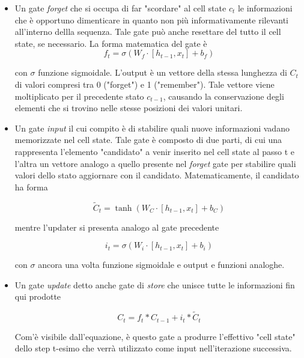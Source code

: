 \documentclass[10pt,letterpaper]{article}
\begin{document}
\begin{itemize}
\item Un gate \textit{forget} che si occupa di far "scordare" al cell state $c_t$ le informazioni che è opportuno dimenticare in quanto non più informativamente rilevanti all'interno dellla sequenza. Tale gate può anche resettare del tutto il cell state, se necessario. La forma matematica del gate è
\begin{equation}
f_t = \sigma(W_f \cdot [h_{t-1},x_t] + b_f)
\end{equation}

con $\sigma$ funzione sigmoidale. L'output è un vettore della stessa lunghezza di $C_t$ di valori compresi tra 0 ("forget") e 1 ("remember"). Tale vettore viene moltiplicato per il precedente stato $c_{t-1}$, causando la conservazione degli elementi che si trovino nelle stesse posizioni dei valori unitari.
\item Un gate \textit{input} il cui compito è di stabilire quali nuove informazioni vadano memorizzate nel cell state. Tale gate è composto di due parti, di cui una rappresenta l'elemento "candidato" a venir inserito nel cell state al passo t e l'altra un vettore analogo a quello presente nel \textit{forget} gate per stabilire quali valori dello stato aggiornare con il candidato. Matematicamente, il candidato ha forma

\begin{equation}
\tilde{C}_t = \tanh(W_C \cdot [h_{t-1},x_t] + b_C)
\end{equation}

mentre l'updater si presenta analogo al gate precedente

\begin{equation}
i_t = \sigma(W_i \cdot [h_{t-1},x_t] + b_i)
\end{equation}

con $\sigma$ ancora una volta funzione sigmoidale e output e funzioni analoghe.

\item Un gate \textit{update} detto anche gate di \textit{store} che unisce tutte le informazioni fin qui prodotte

\begin{equation}
C_t = f_t * C_{t-1} + i_t * \tilde{C}_t
\end{equation}

Com'è visibile dall'equazione, è questo gate a produrre l'effettivo "cell state" dello step t-esimo che verrà utilizzato come input nell'iterazione successiva.


\end{itemize}
\end{document}
